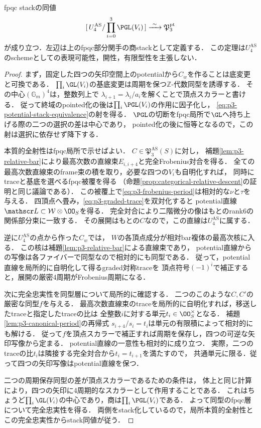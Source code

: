 \begin{theorem}[相対potential表示とpointedモジュライ]
\label{thm:p3-potential-stack}
fpqc stackの同値
\begin{equation}\label{eq:p3-potential-stack-equivalence}
 [\,U_4^{\mathrm{AS}}/\prod_{i=0}^3\PGL(V_i)\,]
 \xrightarrow{\ \sim\ }\mathfrak P_3^{\mathrm{pt}}
\end{equation}
が成り立つ．左辺は上のfpqc部分関手の商stackとして定義する．
この定理は$U_4^{\mathrm{AS}}$のschemeとしての表現可能性，開性，有限型性を主張しない．
\end{theorem}
\begin{proof}
まず，固定した四つの矢印空間上のpotentialから$C_w$を作ることは底変更と可換である．
$\prod_i\GL(V_i)$の基底変更は周期を保つ$\mathbb Z$-代数同型を誘導する．
その中心$(\mathbb G_m)^4$は，整数列上で
$\lambda_{i+1}=\lambda_i/a_i$を解くことで頂点スカラーと書ける．
従って終域のpointed化の後は$\prod_i\PGL(V_i)$の作用に因子化し，
\eqref{eq:p3-potential-stack-equivalence}の射を得る．
$\PGL$の切断をfpqc局所で$\GL$へ持ち上げる際の二つの選択の差は中心であり，
pointed化の後に恒等となるので，この射は選択に依存せず降下する．

本質的全射性はfpqc局所で示せばよい．
$C\in\mathfrak P_3^{\mathrm{AS}}(S)$に対し，
補題\ref{lem:p3-relative-bar}により最高次数の直線束$E_{i,i+4}$と完全Frobenius対合を得る．
全ての最高次数直線束のframe束の積を取り，必要な四つの$V_i$も自明化すれば，
同時にtraceと基底を選べるfpqc被覆を得る
（命題\ref{prop:categorical-relative-descent}の証明と同じ議論である）．
この被覆上で\eqref{eq:p3-frobenius-period}は相対的な$\nu$と$\tau$を与える．
四頂点へ畳み，\eqref{eq:p3-graded-trace}を双対化すると
potential直線$\mathscr L\subset\mathcal W\otimes\OO_S$を得る．
完全対合により二階微分の像はもとのrank6の関係部分束に一致する．
その展開はもとの$C$なので，この直線は$U_4^{\mathrm{AS}}$に属する．

逆に$U_4^{\mathrm{AS}}$の点から作った$C_w$では，
$W$の各頂点成分が相対bar複体の最高次核に入る．
この核は補題\ref{lem:p3-relative-bar}による直線束であり，
potential直線からの写像は各ファイバーで同型なので相対的にも同型である．
従って，potential直線を局所的に自明化して得るgraded対称traceを
頂点符号$(-1)^i$で補正すると，展開の厳密4周期がFrobenius周期になる．

次に完全忠実性を同型層について局所的に確認する．
二つのこのような$C,C'$の厳密な同型$f$を与える．
最高次数直線束のtraceを局所的に自明化すれば，移送したtraceと指定したtraceの比は
全整数$i$に対する単元$t_i\in\OO_S^\times$となる．
補題\ref{lem:p3-canonical-period}の再帰式
$s_{i+4}/s_i=t_i$は単元の有限積によって相対的にも解ける．
従って$f$を頂点スカラーで補正すれば周期を保存し，四つの可逆な矢印写像から定まる．
potential直線の一意性も相対的に成り立つ．
実際，二つのtraceの比$t_i$は隣接する完全対合から$t_i=t_{i+1}$を満たすので，
共通単元に限る．従って四つの矢印写像はpotential直線を保つ．

二つの周期保存同型の差が頂点スカラーであるための条件は，
体上と同じ計算により，四つの矢印に4周期的なスカラーとして作用することである．
これはちょうど$\prod_i\GL(V_i)$の中心であり，商は$\prod_i\PGL(V_i)$である．
よって同型のfpqc層について完全忠実性を得る．
両側をstack化しているので，局所本質的全射性とこの完全忠実性からstack同値が従う．
\end{proof}

